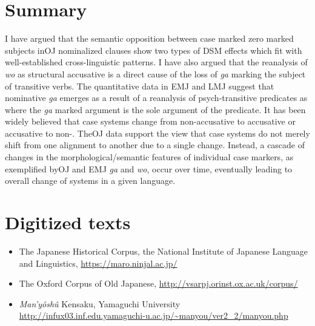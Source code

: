 \documentclass[output=paper]{LSP/langsci}
\begin{document}
\section{Summary}
\label{14-ya-sec:5}

I have argued that the semantic opposition between case marked \vs zero marked subjects inOJ  nominalized clauses show two types of DSM effects which fit with well-established cross-linguistic patterns. I have also argued that the reanalysis of \textit{wo} as structural accusative is a direct cause of the loss of  \textit{ga} marking the subject of transitive verbs. The quantitative data in EMJ and LMJ suggest that nominative \textit{ga} emerges as a result of a reanalysis of psych-transitive predicates as  where the \textit{ga} marked argument is the sole argument of the predicate. It has been widely believed that case systems change from non-accusative to accusative or accusative to non-. TheOJ  data support the view that case systems do not merely shift from one alignment to another due to a single change. Instead, a cascade of changes in the morphological/semantic features of individual case markers, as exemplified byOJ  and EMJ \textit{ga} and \textit{wo}, occur over time, eventually leading to overall change of  systems in a given language. 


\section*{Digitized texts}
\label{14-ya-sec:Dig}
\begin{itemize}
\item The Japanese Historical Corpus, the National Institute of Japanese Language and Linguistics, \url{https://maro.ninjal.ac.jp/}
\item The Oxford Corpus of Old Japanese, \url{http://vsarpj.orinst.ox.ac.uk/corpus/}
\item \textit{Man’yôshû} Kensaku, Yamaguchi University\\ \url{http://infux03.inf.edu.yamaguchi-u.ac.jp/~manyou/ver2_2/manyou.php}
\end{itemize}

\largerpage[2]
\end{document}
